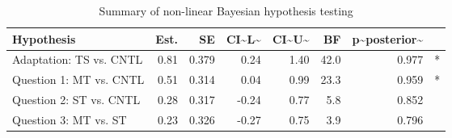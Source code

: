 \begin{table}

\caption{\label{tab:unnamed-chunk-30}Summary of non-linear Bayesian hypothesis testing}
\centering
\begin{tabular}[t]{l|r|r|r|r|r|r|l}
\hline
Hypothesis & Est. & SE & CI\textasciitilde{}L\textasciitilde{} & CI\textasciitilde{}U\textasciitilde{} & BF & p\textasciitilde{}posterior\textasciitilde{} & \\
\hline
Adaptation: TS vs. CNTL & 0.81 & 0.379 & 0.24 & 1.40 & 42.0 & 0.977 & *\\
\hline
Question 1: MT vs. CNTL & 0.51 & 0.314 & 0.04 & 0.99 & 23.3 & 0.959 & *\\
\hline
Question 2: ST vs. CNTL & 0.28 & 0.317 & -0.24 & 0.77 & 5.8 & 0.852 & \\
\hline
Question 3: MT vs. ST & 0.23 & 0.326 & -0.27 & 0.75 & 3.9 & 0.796 & \\
\hline
\end{tabular}
\end{table}
